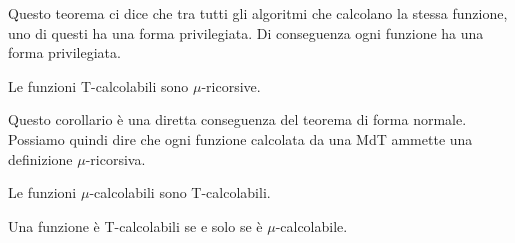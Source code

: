 Questo teorema ci dice che tra tutti gli algoritmi che calcolano
la stessa funzione, uno di questi ha una forma privilegiata. Di
conseguenza ogni funzione ha una forma privilegiata.

\begin{theorem}
	Le funzioni T-calcolabili sono $\mu$-ricorsive.
\end{theorem}

Questo corollario è una diretta conseguenza del teorema di
forma normale. Possiamo quindi dire che ogni funzione calcolata
da una MdT ammette una definizione $\mu$-ricorsiva.

\begin{lemma}
	Le funzioni $\mu$-calcolabili sono T-calcolabili.
\end{lemma}

\begin{theorem}
	Una funzione è T-calcolabili se e solo se è
	$\mu$-calcolabile.
\end{theorem}
